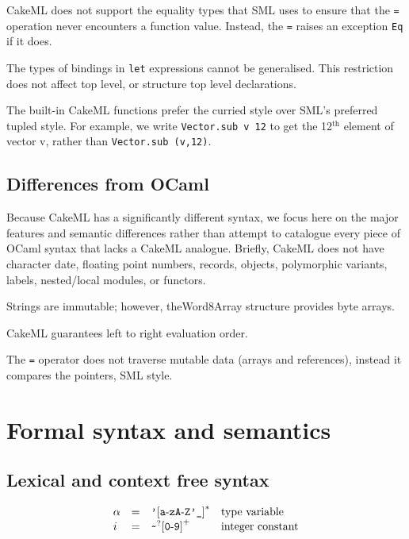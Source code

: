 \documentclass[12pt,a4paper]{book}
\begin{document}
CakeML does not support the equality types that SML uses to ensure that the \texttt{=} operation never encounters a function value. Instead, the \texttt{=} raises an exception \texttt{Eq} if it does.

The types of bindings in \texttt{let} expressions cannot be generalised. This restriction does not affect top level, or structure top level declarations.

The built-in CakeML functions prefer the curried style over SML's preferred tupled style. For example, we write \texttt{Vector.sub v 12} to get the 12$^\textrm{th}$ element of vector v, rather than \texttt{Vector.sub (v,12)}.

\section{Differences from OCaml}

Because CakeML has a significantly different syntax, we focus here on the major features and semantic differences rather than attempt to catalogue every piece of OCaml syntax that lacks a CakeML analogue. Briefly, CakeML does not have character date, floating point numbers, records, objects,  polymorphic variants, labels, nested/local modules, or functors.

Strings are immutable; however, theWord8Array structure provides byte arrays.

CakeML guarantees left to right evaluation order.

The \texttt{=} operator does not traverse mutable data (arrays and references), instead it compares the pointers, SML style.

\chapter{Formal syntax and semantics}

\section{Lexical and context free syntax}

\[
\begin{array}{lcll}
\alpha&=& \mbox{\texttt{'}[\texttt{a}-\texttt{z}\texttt{A}-\texttt{Z}\texttt{'}\texttt{\_}]}^*&\mbox{type variable}\\
i &=& \verb|~|^?\mbox{[\texttt{0}-\texttt{9}]}^+&\mbox{integer constant}\\
\end{array}
\]
\end{document}
